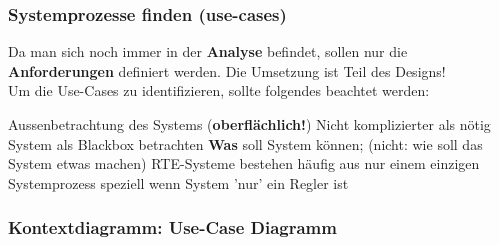 \subsubsection{Systemprozesse finden (use-cases)}

Da man sich noch immer in der \textbf{Analyse} befindet, sollen nur die \textbf{Anforderungen} definiert werden. Die Umsetzung ist Teil
des Designs! \\
Um die Use-Cases zu identifizieren, sollte folgendes beachtet werden:

\vspace{0.1cm}

\begin{outline}
    \1 Aussenbetrachtung des Systems (\textbf{oberflächlich!})
        \2 Nicht komplizierter als nötig
    \1 System als Blackbox betrachten 
        \2 \textbf{Was} soll System können; (nicht: wie soll das System etwas machen)
    \1 RTE-Systeme bestehen häufig aus nur einem einzigen Systemprozess 
        \2 speziell wenn System 'nur' ein Regler ist
\end{outline}


\subsubsection{Kontextdiagramm: Use-Case Diagramm}

